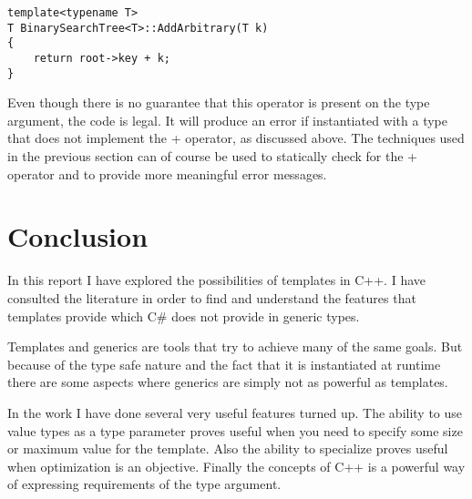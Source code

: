 \begin{lstlisting}
template<typename T>
T BinarySearchTree<T>::AddArbitrary(T k)
{
	return root->key + k;
}
\end{lstlisting}

Even though there is no guarantee that this operator is present on the type argument, the code is legal.
It will produce an error if instantiated with a type that does not implement the + operator, as discussed above.
The techniques used in the previous section can of course be used to statically check for the + operator and to provide more meaningful error messages.

\section{Conclusion}
In this report I have explored the possibilities of templates in C++.
I have consulted the literature in order to find and understand the features that templates provide which C\# does not provide in generic types.

Templates and generics are tools that try to achieve many of the same goals.
But because of the type safe nature and the fact that it is instantiated at runtime there are some aspects where generics are simply not as powerful as templates.

In the work I have done several very useful features turned up.
The ability to use value types as a type parameter proves useful when you need to specify some size or maximum value for the template.
Also the ability to specialize proves useful when optimization is an objective.
Finally the concepts of C++ is a powerful way of expressing requirements of the type argument.





